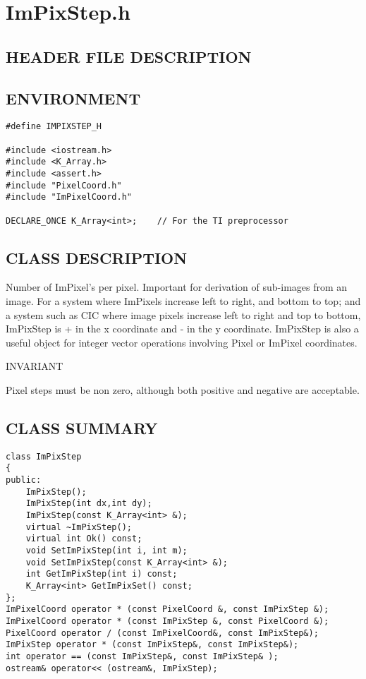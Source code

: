 \clearpage
\section{ImPixStep.h}

\subsection*{HEADER FILE DESCRIPTION}

\subsection*{ENVIRONMENT}
\begin{verbatim}
#define IMPIXSTEP_H

#include <iostream.h>
#include <K_Array.h>
#include <assert.h>
#include "PixelCoord.h"
#include "ImPixelCoord.h"

DECLARE_ONCE K_Array<int>;    // For the TI preprocessor
\end{verbatim}

\subsection*{CLASS DESCRIPTION}
   Number of ImPixel's per pixel. Important for derivation of sub-images from
   an image. For a system where ImPixels increase left to right, and
   bottom to top; and a system such as CIC where image pixels increase
   left to right and top to bottom, ImPixStep is + in the x coordinate and
   - in the y coordinate. ImPixStep is also a useful object for integer
   vector operations involving Pixel or ImPixel coordinates.
  
   INVARIANT
  
   Pixel steps must be non zero, although both positive and negative are
   acceptable.
   
\subsection*{CLASS SUMMARY}
\begin{verbatim}
class ImPixStep
{
public:
    ImPixStep();
    ImPixStep(int dx,int dy);
    ImPixStep(const K_Array<int> &);
    virtual ~ImPixStep();
    virtual int Ok() const;
    void SetImPixStep(int i, int m);
    void SetImPixStep(const K_Array<int> &);
    int GetImPixStep(int i) const;
    K_Array<int> GetImPixSet() const;
};
ImPixelCoord operator * (const PixelCoord &, const ImPixStep &);
ImPixelCoord operator * (const ImPixStep &, const PixelCoord &);
PixelCoord operator / (const ImPixelCoord&, const ImPixStep&);
ImPixStep operator * (const ImPixStep&, const ImPixStep&);
int operator == (const ImPixStep&, const ImPixStep& );
ostream& operator<< (ostream&, ImPixStep);
\end{verbatim}

